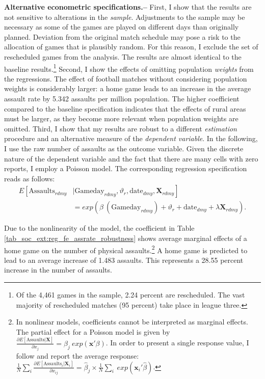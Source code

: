 \textbf{Alternative econometric specifications.--} First, I show that the results are not sensitive to alterations in the \textit{sample}. Adjustments to the sample may be necessary as some of the games are played on different days than originally planned. Deviation from the original match schedule may pose a risk to the allocation of games that is plausibly random. For this reason, I exclude the set of rescheduled games from the analysis. The results are almost identical to the baseline results.\footnote{Of the 4,461 games in the sample, 2.24 percent are rescheduled. The vast majority of rescheduled matches (95 percent) take place in league three.} Second, I show the effects of omitting population \textit{weights} from the regressions. The effect of football matches without considering population weights is considerably larger: a home game leads to an increase in the average assault rate by 5.342 assaults per million population. The higher coefficient compared to the baseline specification indicates that the effects of rural areas must be larger, as they become more relevant when population weights are omitted. Third, I show that my results are robust to a different \textit{estimation} procedure and an alternative measure of the \textit{dependent variable}. In the following, I use the raw number of assaults as the outcome variable. Given the discrete nature of the dependent variable and the fact that there are many cells with zero reports, I employ a Poisson model. The corresponding regression specification reads as follows:
\begin{align}
E\left[ \text{Assaults}_{rdmy}\right.&|\left.\text{Gameday}_{rdmy},\vartheta_r,\text{date}_{dmy}, \mathbf{X}_{rdmy} \right] \nonumber \\ &= exp\left( \beta\ (\text{Gameday}_{rdmy}) + \vartheta_r + \text{date}_{dmy} + \lambda\mathbf{X}_{rdmy} \right). 
\label{eq_soc_ext:poisson_model}
\end{align}

Due to the nonlinearity of the model, the coefficient in Table \ref{tab_soc_ext:reg_fe_assrate_robustness} shows average marginal effects of a home game on the number of physical assaults.\footnote{In nonlinear models, coefficients cannot be interpreted as marginal effects. The partial effect for a Poisson model is given by $\frac{\partial E\left[ \text{Assaults}| \mathbf{X}\right]}{\partial x_j} = \beta_j\ exp(\mathbf{x'}\beta)$. In order to present a single response value, I follow \cite{cameron2005microeconometrics} and report the average response: $\frac{1}{N}\sum_i \frac{\partial E\left[ \text{Assaults}_i| \mathbf{X}_i\right]}{\partial x_{ij}} = \hat\beta_j \times \frac{1}{N} \sum_i\ exp(\mathbf{x}_i'\hat\beta)$.} A home game is predicted to lead to an average increase of 1.483 assaults. This represents a 28.55 percent increase in the number of assaults. \newline


